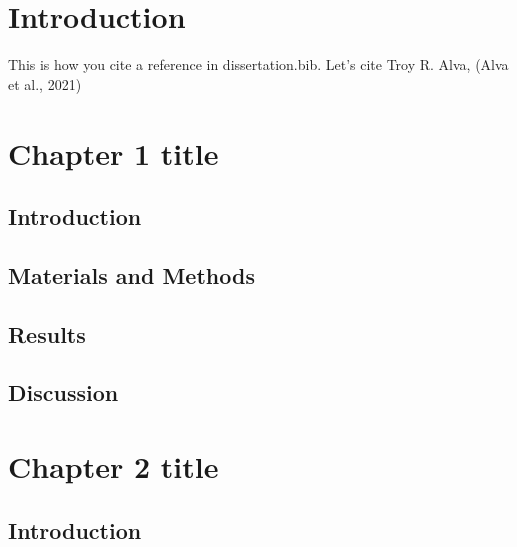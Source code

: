 \documentclass[12pt,oneside]{ucrthesis}
\begin{document}
\hypertarget{introduction}{%
\chapter*{Introduction}\label{introduction}}


This is how you cite a reference in dissertation.bib.
Let's cite Troy R. Alva, (Alva et al., 2021)

\lipsum

\hypertarget{chapter1-tag}{%
\chapter{Chapter 1 title}\label{chapter1-tag}}

\lipsum

\hypertarget{introduction-1}{%
\section{Introduction}\label{introduction-1}}

\lipsum

\hypertarget{materials-and-methods}{%
\section{Materials and Methods}\label{materials-and-methods}}

\lipsum

\hypertarget{results}{%
\section{Results}\label{results}}

\lipsum

\hypertarget{discussion}{%
\section{Discussion}\label{discussion}}

\lipsum

\hypertarget{chapter2-tag}{%
\chapter{Chapter 2 title}\label{chapter2-tag}}

\lipsum

\hypertarget{introduction-2}{%
\section{Introduction}\label{introduction-2}}
\end{document}
